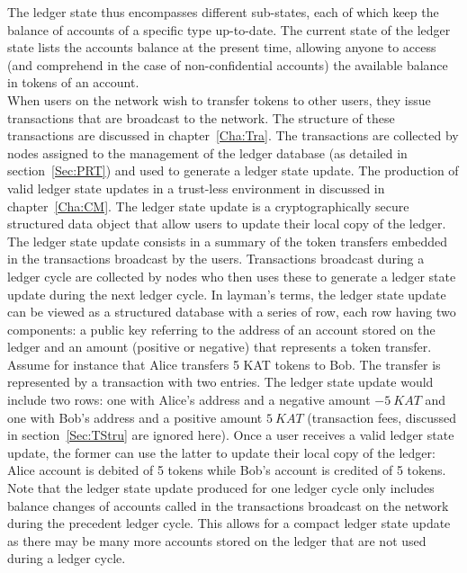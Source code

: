 The ledger state thus encompasses different sub-states, each of which keep the balance of accounts of a specific type up-to-date. The current state of the ledger state lists the accounts balance at the present time, allowing anyone to access (and comprehend in the case of non-confidential accounts) the available balance in tokens of an account. \\

When users on the network wish to transfer tokens to other users, they issue transactions that are broadcast to the network. The structure of these transactions are discussed in chapter~\ref{Cha:Tra}. The transactions are collected by nodes assigned to the management of the ledger database (as detailed in section~\ref{Sec:PRT}) and used to generate a ledger state update. The production of valid ledger state updates in a trust-less environment in discussed in chapter~\ref{Cha:CM}. The ledger state update is a cryptographically secure structured data object that allow users to update their local copy of the ledger. \\

The ledger state update consists in a summary of the token transfers embedded in the transactions broadcast by the users. Transactions broadcast during a ledger cycle are collected by nodes who then uses these to generate a ledger state update during the next ledger cycle.  In layman's terms, the ledger state update can be viewed as a structured database with a series of row, each row having two components: a public key referring to the address of an account stored on the ledger and an amount (positive or negative) that represents a token transfer.\\ 

Assume for instance that Alice transfers 5 KAT tokens to Bob. The transfer is represented by a transaction with two entries. The ledger state update would include two rows: one with Alice's address and a negative amount $-5~KAT$ and one with Bob's address and a positive amount $5~KAT$ (transaction fees, discussed in section~\ref{Sec:TStru} are ignored here). Once a user receives a valid ledger state update, the former can use the latter to update their local copy of the ledger: Alice account is debited of 5 tokens while Bob's account is credited of 5 tokens. Note that the ledger state update produced for one ledger cycle only includes balance changes of accounts called in the transactions broadcast on the network during the precedent ledger cycle. This allows for a compact ledger state update as there may be many more accounts stored on the ledger that are not used during a ledger cycle.\\

